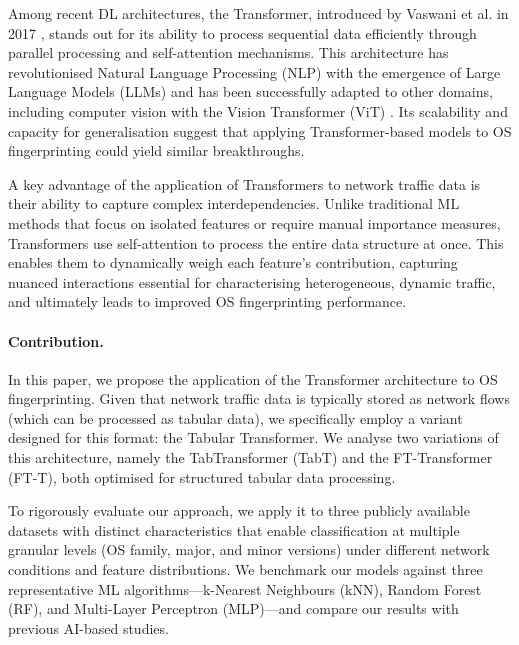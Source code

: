 Among recent DL architectures, the Transformer, introduced by Vaswani et al. in 2017 \cite{vaswani_attention_2023}, stands out for its ability to process sequential data efficiently through parallel processing and self-attention mechanisms. This architecture has revolutionised Natural Language Processing (NLP) with the emergence of Large Language Models (LLMs) and has been successfully adapted to other domains, including computer vision with the Vision Transformer (ViT) \cite{dosovitskiy_image_2021}. Its scalability and capacity for generalisation suggest that applying Transformer-based models to OS fingerprinting could yield similar breakthroughs.

A key advantage of the application of Transformers to network traffic data is their ability to capture complex interdependencies. Unlike traditional ML methods that focus on isolated features or require manual importance measures, Transformers use self-attention to process the entire data structure at once. This enables them to dynamically weigh each feature’s contribution, capturing nuanced interactions essential for characterising heterogeneous, dynamic traffic, and ultimately leads to improved OS fingerprinting performance.

\paragraph{Contribution.} In this paper, we propose the application of the Transformer architecture to OS fingerprinting. Given that network traffic data is typically stored as network flows (which can be processed as tabular data), we specifically employ a variant designed for this format: the Tabular Transformer. We analyse two variations of this architecture, namely the TabTransformer (TabT) and the FT-Transformer (FT-T), both optimised for structured tabular data processing.

To rigorously evaluate our approach, we apply it to three publicly available datasets with distinct characteristics that enable classification at multiple granular levels (OS family, major, and minor versions) under different network conditions and feature distributions. We benchmark our models against three representative ML algorithms—k-Nearest Neighbours (kNN), Random Forest (RF), and Multi-Layer Perceptron (MLP)—and compare our results with previous AI-based studies. 

